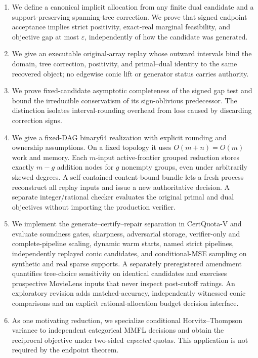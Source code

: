 \documentclass[smallextended,envcountsect]{svjour3}
\begin{document}
\begin{enumerate}[leftmargin=*,itemsep=2pt]
 \item We define a canonical implicit allocation from any finite dual candidate
 and a support-preserving spanning-tree correction.  We prove that signed
 endpoint acceptance implies strict positivity, exact-real marginal
 feasibility, and objective gap at most $\varepsilon$, independently of how the
 candidate was generated.
 \item We give an executable original-array replay whose outward intervals bind
 the domain, tree correction, positivity, and primal--dual identity to the same
 recovered object; no edgewise conic lift or generator status carries
 authority.
 \item We prove fixed-candidate asymptotic completeness of the signed gap test
 and bound the irreducible conservatism of its sign-oblivious predecessor.  The
 distinction isolates interval-rounding overhead from loss caused by discarding
 correction signs.
 \item We give a fixed-DAG binary64 realization with explicit rounding and
 ownership assumptions.  On a fixed topology it uses $O(m+n)=O(m)$ work and
 memory.  Each $m$-input active-frontier grouped reduction stores exactly
 $m-g$ addition nodes for $g$ nonempty groups, even under arbitrarily skewed
 degrees.  A self-contained content-bound bundle lets a fresh process
 reconstruct all replay inputs and issue a new authoritative decision. A
 separate integer/rational checker evaluates the original primal and dual
 objectives without importing the production verifier.
 \item We implement the generate--certify--repair separation in CertQuota-V and
 evaluate soundness gates, sharpness, adversarial storage, verifier-only and
 complete-pipeline scaling, dynamic warm starts, named strict pipelines,
 independently replayed conic candidates, and conditional-MSE sampling on
 synthetic and real sparse supports.  A separately preregistered amendment
 quantifies tree-choice sensitivity on identical candidates and exercises
 prospective MovieLens inputs that never inspect post-cutoff ratings. An
 exploratory revision adds matched-accuracy, independently witnessed conic
 comparisons and an explicit rational-allocation budget decision interface.
 \item As one motivating reduction, we specialize conditional
 Horvitz--Thompson variance to independent categorical MMFL decisions and obtain
 the reciprocal objective under two-sided \emph{expected} quotas.  This
 application is not required by the endpoint theorem.
\end{enumerate}
\end{document}
